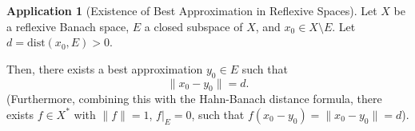 \documentclass[11pt,a4paper]{article}
\theoremstyle{plain}
\theoremstyle{definition}
\newtheorem{application}{Application}[section]
\begin{document}



\begin{application}[Existence of Best Approximation in Reflexive Spaces]
    Let \(X\) be a reflexive Banach space, \(E\) a closed subspace of \(X\), and \(x_0 \in X \setminus E\). Let \(d = \mathrm{dist}(x_0, E) > 0\).

    Then, there exists a best approximation \(y_0 \in E\) such that
    \[
        \|x_0 - y_0\| = d.
    \]
    (Furthermore, combining this with the Hahn-Banach distance formula, there exists \(f \in X^*\) with \(\|f\|=1\), \(f|_E = 0\), such that \(f(x_0 - y_0) = \|x_0 - y_0\| = d\)).
\end{application}
\end{document}
